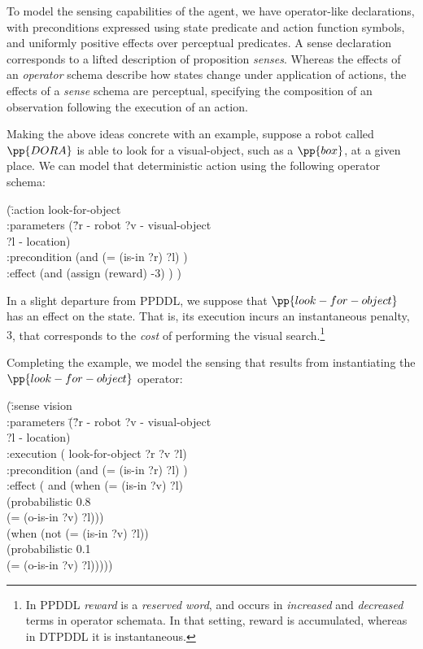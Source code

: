 \documentclass{article}
\begin{document}
\noindent To model the sensing capabilities of the agent, we have
operator-like declarations, with preconditions expressed using state
predicate and action function symbols, and uniformly positive effects
over perceptual predicates. A sense declaration corresponds to a
lifted description of proposition {\em senses}. Whereas the effects of
an {\em operator} schema describe how states change under application
of actions, the effects of a {\em sense} schema are perceptual,
specifying the composition of an observation following the execution
of an action. 


Making the above ideas concrete with an example, suppose a robot
called $\pp{DORA}$ is able to look for a visual-object, such as a
$\pp{box}$, at a given place. We can model that deterministic action
using the following operator schema:


\small
\begin{tabtt}
(\=:action look-for-object \+ \\
   :parameters (\=?r - robot ?v - visual-object\\
   \> ?l - location) \\
   :precondition (and (= (is-in ?r) ?l) ) \\
   :effect (and (assign (reward) -3) ) ) \\
\end{tabtt}
\normalsize


\noindent In a slight departure from PPDDL, we suppose that
$\pp{look-for-object}$ has an effect on the state. That is, its
execution incurs an instantaneous penalty, $3$, that corresponds to
the {\em cost} of performing the visual search.\footnote{In PPDDL {\em
reward} is a {\em reserved word}, and occurs in {\em increased} and
{\em decreased} terms in operator schemata. In that setting, reward is
accumulated, whereas in DTPDDL it is instantaneous.}

Completing the example, we model the sensing that results from
instantiating the $\pp{look-for-object}$ operator:

\small
\begin{tabtt}
(\= :sense vision \+\\
 :parameters \= (\= ?r - robot ?v - visual-object\\
 \>\>  ?l - location) \\
 :execution \> ( \> look-for-object ?r ?v ?l) \\
 :precondition (and (= (is-in ?r) ?l) ) \\
 :effect \>  (  \> and (when (= (is-in ?v) ?l) \\
   \> \> (probabilistic 0.8 \\
   \>  \>(= (o-is-in ?v) ?l))) \\
  \> (when (not (= (is-in ?v) ?l)) \\
   \>  \> (probabilistic 0.1 \\
   \>  \> (= (o-is-in ?v) ?l))))) \\
\end{tabtt}
\normalsize
\end{document}
